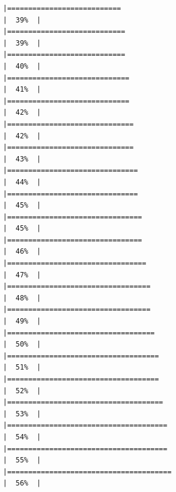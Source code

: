 \documentclass[
]{article}
\begin{document}
\begin{verbatim}
|===========================                                           |  39%  |                                                                              |============================                                          |  39%  |                                                                              |============================                                          |  40%  |                                                                              |=============================                                         |  41%  |                                                                              |=============================                                         |  42%  |                                                                              |==============================                                        |  42%  |                                                                              |==============================                                        |  43%  |                                                                              |===============================                                       |  44%  |                                                                              |===============================                                       |  45%  |                                                                              |================================                                      |  45%  |                                                                              |================================                                      |  46%  |                                                                              |=================================                                     |  47%  |                                                                              |==================================                                    |  48%  |                                                                              |==================================                                    |  49%  |                                                                              |===================================                                   |  50%  |                                                                              |====================================                                  |  51%  |                                                                              |====================================                                  |  52%  |                                                                              |=====================================                                 |  53%  |                                                                              |======================================                                |  54%  |                                                                              |======================================                                |  55%  |                                                                              |=======================================                               |  56%  |                                                                              
\end{verbatim}
\end{document}
